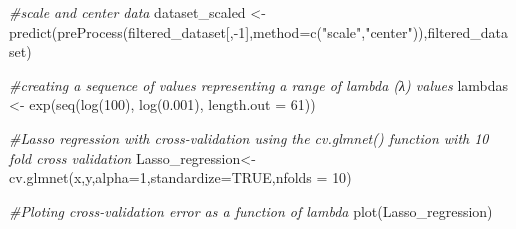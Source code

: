 \documentclass[
]{article}
\newenvironment{Shaded}{\begin{snugshade}}{\end{snugshade}}
\newcommand{\AttributeTok}[1]{\textcolor[rgb]{0.77,0.63,0.00}{#1}}
\newcommand{\CommentTok}[1]{\textcolor[rgb]{0.56,0.35,0.01}{\textit{#1}}}
\newcommand{\ConstantTok}[1]{\textcolor[rgb]{0.00,0.00,0.00}{#1}}
\newcommand{\DecValTok}[1]{\textcolor[rgb]{0.00,0.00,0.81}{#1}}
\newcommand{\FloatTok}[1]{\textcolor[rgb]{0.00,0.00,0.81}{#1}}
\newcommand{\FunctionTok}[1]{\textcolor[rgb]{0.00,0.00,0.00}{#1}}
\newcommand{\NormalTok}[1]{#1}
\newcommand{\OtherTok}[1]{\textcolor[rgb]{0.56,0.35,0.01}{#1}}
\newcommand{\SpecialCharTok}[1]{\textcolor[rgb]{0.00,0.00,0.00}{#1}}
\newcommand{\StringTok}[1]{\textcolor[rgb]{0.31,0.60,0.02}{#1}}
\begin{document}
\begin{Shaded}
\begin{Highlighting}[]
\CommentTok{\#scale and center data}
\NormalTok{dataset\_scaled }\OtherTok{\textless{}{-}} \FunctionTok{predict}\NormalTok{(}\FunctionTok{preProcess}\NormalTok{(filtered\_dataset[,}\SpecialCharTok{{-}}\DecValTok{1}\NormalTok{],}\AttributeTok{method=}\FunctionTok{c}\NormalTok{(}\StringTok{"scale"}\NormalTok{,}\StringTok{"center"}\NormalTok{)),filtered\_dataset)}
\end{Highlighting}
\end{Shaded}

\begin{Shaded}
\end{Shaded}

\begin{Shaded}
\begin{Highlighting}[]
\CommentTok{\#creating a sequence of values representing a range of lambda (λ) values}
\NormalTok{lambdas }\OtherTok{\textless{}{-}} \FunctionTok{exp}\NormalTok{(}\FunctionTok{seq}\NormalTok{(}\FunctionTok{log}\NormalTok{(}\DecValTok{100}\NormalTok{), }\FunctionTok{log}\NormalTok{(}\FloatTok{0.001}\NormalTok{), }\AttributeTok{length.out =} \DecValTok{61}\NormalTok{))}
\end{Highlighting}
\end{Shaded}

\begin{Shaded}
\begin{Highlighting}[]
\CommentTok{\#Lasso regression with cross{-}validation using the cv.glmnet() function with 10 fold cross validation}
\NormalTok{Lasso\_regression}\OtherTok{\textless{}{-}} \FunctionTok{cv.glmnet}\NormalTok{(x,y,}\AttributeTok{alpha=}\DecValTok{1}\NormalTok{,}\AttributeTok{standardize=}\ConstantTok{TRUE}\NormalTok{,}\AttributeTok{nfolds =} \DecValTok{10}\NormalTok{)}
\end{Highlighting}
\end{Shaded}

\begin{Shaded}
\begin{Highlighting}[]
\CommentTok{\#Ploting cross{-}validation error as a function of lambda}
\FunctionTok{plot}\NormalTok{(Lasso\_regression)}
\end{Highlighting}
\end{Shaded}
\end{document}

